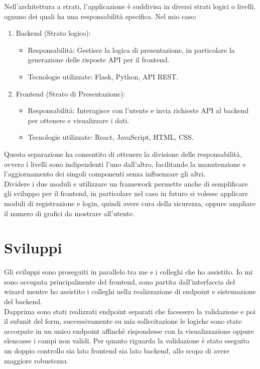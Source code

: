 Nell'architettura a strati, l'applicazione è suddivisa in diversi strati logici o livelli, ognuno dei quali ha una responsabilità specifica. Nel mio caso:
\begin{enumerate}
\item Backend (Strato logico):
    \begin{itemize}
        \item  Responsabilità: Gestisce la logica di presentazione, in particolare la generazione delle risposte API per il frontend.
        \item  Tecnologie utilizzate: Flask, Python, API REST.
    \end{itemize}
\item Frontend (Strato di Presentazione):
 \begin{itemize}
    \item Responsabilità: Interagisce con l'utente e invia richieste API al backend per ottenere e visualizzare i dati.
    \item Tecnologie utilizzate: React, JavaScript, HTML, CSS.
    \end{itemize}
\end{enumerate}
Questa separazione ha consentito di ottenere la divisione delle responsabilità, ovvero i livelli sono indipendenti l'uno dall'altro, facilitando la manutenzione e l'aggiornamento dei singoli componenti senza influenzare gli altri.\\

Dividere i due moduli e utilizzare un framework permette anche di semplificare gli sviluppo per il frontend, in particolare nel caso in futuro si volesse applicare moduli di registrazione e login, quindi avere cura della sicurezza, oppure ampliare il numero di grafici da mostrare all'utente. \\


\section{Sviluppi}
Gli sviluppi sono proseguiti in parallelo tra me e i colleghi che ho assistito. Io mi sono occupata principalmente del frontend, sono partita dall'interfaccia del wizard mentre ho assistito i colleghi nella realizzazione di endpoint e sistemazione del backend.\\
Dapprima sono stati realizzati endpoint separati che facessero la validazione e poi il submit del form, successivamente su mia sollecitazione le logiche sono state accorpate in un unico endpoint affinchè rispondesse con la visualizzazione oppure elencasse i campi non validi. Per quanto riguarda la validazione è stato eseguito un doppio controllo sia lato frontend sia lato backend, allo scopo di avere maggiore robustezza.\\


